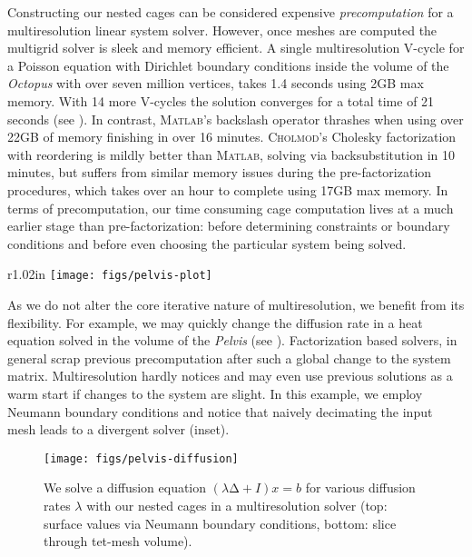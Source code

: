 



%
Constructing our nested cages can be considered expensive \emph{precomputation}
for a multiresolution linear system solver.
%
However, once meshes are computed the multigrid solver is sleek and memory
efficient.
%
A single multiresolution V-cycle for a Poisson equation with Dirichlet boundary
conditions inside the volume of the \emph{Octopus} with over seven million
vertices, takes 1.4 seconds using 2GB max memory. With 14 more V-cycles the
solution converges for a total time of 21 seconds (see
).
%
In contrast, \textsc{Matlab}'s backslash operator thrashes when using over 22GB
of memory finishing in over 16 minutes.
%
\textsc{Cholmod}'s Cholesky factorization with reordering is mildly better than
\textsc{Matlab}, solving via backsubstitution in 10 minutes, but suffers from
similar memory issues during the pre-factorization procedures, which takes over
an hour to complete using 17GB max memory.
%
In terms of precomputation, our time consuming cage computation lives at a much
earlier stage than pre-factorization: before determining constraints or
boundary conditions and before even choosing the particular system being
solved.

\begin{wrapfigure}{r}{1.02in}
%
\centering
%
\texttt{[image: figs/pelvis-plot]}
%
\end{wrapfigure}
%
As we do not alter the core iterative nature of multiresolution, we benefit
from its flexibility. For example, we may quickly change the diffusion rate in
a heat equation solved in the volume of the \emph{Pelvis} (see
). 
%
Factorization based solvers, in general scrap previous precomputation after
such a global change to the system matrix. 
%
Multiresolution hardly notices and may even use previous solutions as a warm
start if changes to the system are slight.
%
In this example, we employ Neumann boundary conditions and notice that naively
decimating the input mesh leads to a divergent solver (inset).

\begin{figure}
  \texttt{[image: figs/pelvis-diffusion]}
  \caption{We solve a diffusion equation $(λ∆+I) x = b$ for various diffusion
  rates $λ$ with our nested cages in a multiresolution solver (top: surface
  values via Neumann boundary conditions, bottom: slice through tet-mesh
  volume).}
  \label{fig:pelvis-diffusion}
\end{figure}

